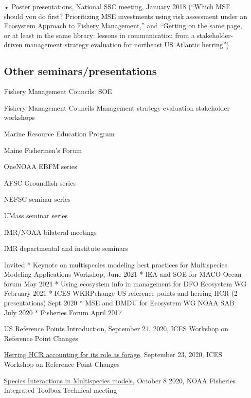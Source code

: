 \documentclass[11pt, a4paper]{awesome-cv}
\begin{document}
• Poster presentations, National SSC meeting, January 2018 (``Which MSE
should you do first? Prioritizing MSE investments using risk assessment
under an Ecosystem Approach to Fishery Management,'' and ``Getting on
the same page, or at least in the same library: lessons in communication
from a stakeholder-driven management strategy evaluation for northeast
US Atlantic herring'')

\hypertarget{other-seminarspresentations}{%
\subsection{Other
seminars/presentations}\label{other-seminarspresentations}}

Fishery Management Councils: SOE

Fishery Management Councils Management strategy evaluation stakeholder
workshops

Marine Resource Education Program

Maine Fishermen's Forum

OneNOAA EBFM series

AFSC Groundfish series

NEFSC seminar series

UMass seminar series

IMR/NOAA bilateral meetings

IMR departmental and institute seminars

Invited * Keynote on multispecies modeling best practices for
Multispecies Modeling Applications Workshop, June 2021 * IEA and SOE for
MACO Ocean forum May 2021 * Using ecosystem info in management for DFO
Ecosystem WG February 2021 * ICES WKRPchange US reference points and
herring HCR (2 presentations) Sept 2020 * MSE and DMDU for Ecosystem WG
NOAA SAB July 2020 * Fisheries Forum April 2017

\href{https://noaa-edab.github.io/presentations/20200921_USrefpts_WKRPchange_Gaichas.html\#1}{US
Reference Points Introduction}, September 21, 2020, ICES Workshop on
Reference Point Changes

\href{https://noaa-edab.github.io/presentations/20200923_herringWKRPchange_Gaichas.html\#1}{Herring
HCR accounting for its role as forage}, September 23, 2020, ICES
Workshop on Reference Point Changes

\href{https://noaa-edab.github.io/presentations/20201008_FIT_MSmods_Gaichas.html\#1}{Species
Interactions in Multispecies models}, October 8 2020, NOAA Fisheries
Integrated Toolbox Technical meeting
\end{document}

